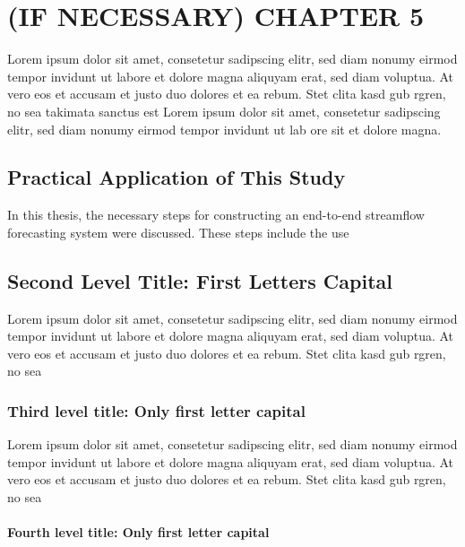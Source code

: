 \chapter{(IF NECESSARY) CHAPTER 5}\label{ch:ifnecch5}

Lorem ipsum dolor sit amet, consetetur sadipscing elitr, sed diam nonumy eirmod tempor invidunt ut labore et dolore magna aliquyam erat, sed diam voluptua. At vero eos et accusam et justo duo dolores et ea rebum. Stet clita kasd gub rgren, no sea takimata sanctus est Lorem ipsum dolor sit amet, consetetur sadipscing elitr, sed diam nonumy eirmod tempor invidunt ut lab ore sit et dolore magna.

\section{Practical Application of This Study}

In this thesis, the necessary steps for constructing an end-to-end streamflow forecasting system were discussed. These steps include the use 

\section{Second Level Title: First Letters Capital}

Lorem ipsum dolor sit amet, consetetur sadipscing elitr, sed diam nonumy eirmod tempor invidunt ut labore et dolore magna aliquyam erat, sed diam voluptua. At vero eos et accusam et justo duo dolores et ea rebum. Stet clita kasd gub rgren, no sea 

\subsection{Third level title: Only first letter capital}

Lorem ipsum dolor sit amet, consetetur sadipscing elitr, sed diam nonumy eirmod tempor invidunt ut labore et dolore magna aliquyam erat, sed diam voluptua. At vero eos et accusam et justo duo dolores et ea rebum. Stet clita kasd gub rgren, no sea 

\subsubsection{Fourth level title: Only first letter capital}

